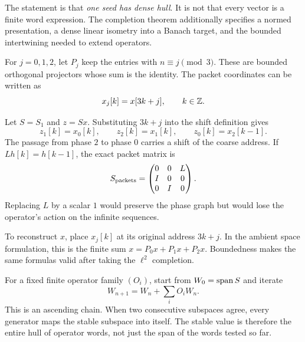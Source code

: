 The statement is that \emph{one seed has dense hull}. It is not that every vector is a finite word expression. The completion theorem additionally specifies a normed presentation, a dense linear isometry into a Banach target, and the bounded intertwining needed to extend operators.


For $j=0,1,2$, let $P_j$ keep the entries with $n\equiv j\pmod3$. These are bounded orthogonal projectors whose sum is the identity. The packet coordinates can be written as
\[
x_j[k]=x[3k+j],\qquad k\in\mathbb Z.
\]


Let $S=S_1$ and $z=Sx$. Substituting $3k+j$ into the shift definition gives
\[
z_1[k]=x_0[k],\qquad z_2[k]=x_1[k],\qquad z_0[k]=x_2[k-1].
\]
The passage from phase $2$ to phase $0$ carries a shift of the coarse address. If $Lh[k]=h[k-1]$, the exact packet matrix is
\[
S_{\mathrm{packets}}=\begin{pmatrix}0&0&L\\I&0&0\\0&I&0\end{pmatrix}.
\]
Replacing $L$ by a scalar $1$ would preserve the phase graph but would lose the operator's action on the infinite sequences.

To reconstruct $x$, place $x_j[k]$ at its original address $3k+j$. In the ambient space formulation, this is the finite sum $x=P_0x+P_1x+P_2x$. Boundedness makes the same formulas valid after taking the $\ell^2$ completion.


For a fixed finite operator family $(O_i)$, start from $W_0=\operatorname{span} S$ and iterate
\[
W_{n+1}=W_n+\sum_i O_iW_n.
\]
This is an ascending chain. When two consecutive subspaces agree, every generator maps the stable subspace into itself. The stable value is therefore the entire hull of operator words, not just the span of the words tested so far.

